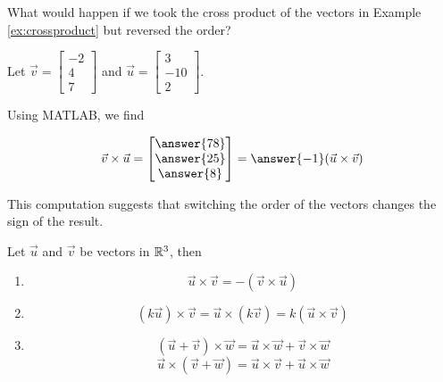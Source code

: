 \documentclass{ximera}
\begin{document}
 
\begin{exploration}\label{init:crossproduct2}
What would happen if we took the cross product of the vectors in Example \ref{ex:crossproduct} but reversed the order?
 
Let $\vec{v}=\begin{bmatrix}-2\\ 4\\ 7\end{bmatrix}$ and $\vec{u}=\begin{bmatrix}3\\ -10\\ 2\end{bmatrix}$.

Using MATLAB, we find 

$$
\vec{v}\times \vec{u}
=\begin{bmatrix}\answer{78}\\ \answer{25}\\ \answer{8}\end{bmatrix}=\answer{-1}(\vec{u}\times\vec{v})$$
 
This computation suggests that switching the order of the vectors changes the sign of the result.
\end{exploration}
 
\begin{theorem}\label{th:corssuvnegcrossvu}
Let $\vec{u}$ and $\vec{v}$ be vectors in $\mathbb{R}^3$, then
\begin{enumerate}
\item $$\vec{u}\times\vec{v}=-(\vec{v}\times\vec{u})$$
\item\label{item:scalarassocofcrossprod} 
$$(k\vec{u})\times \vec{v}=\vec{u}\times (k\vec{v})=k(\vec{u}\times \vec{v})$$
\item\label{item:distofrossprod} 
$$(\vec{u}+\vec{v})\times \vec{w}=\vec{u}\times \vec{w}+\vec{v}\times \vec{w}$$
$$\vec{u}\times (\vec{v}+\vec{w})=\vec{u}\times \vec{v}+\vec{u}\times \vec{w}$$
\end{enumerate}
\end{theorem}
 
\end{document}
